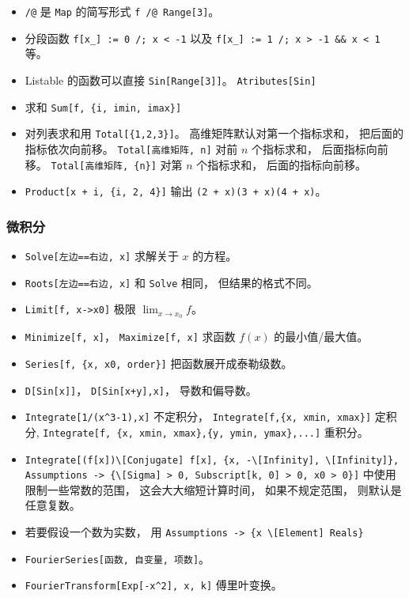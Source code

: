 \begin{itemize}
\item \verb|/@| 是 \verb|Map| 的简写形式 \verb|f /@ Range[3]|。
\item 分段函数 \verb|f[x_] := 0 /; x < -1| 以及 \verb|f[x_] := 1 /; x > -1 && x < 1| 等。
\item Listable 的函数可以直接 \verb|Sin[Range[3]]|。 \verb|Atributes[Sin]|
\item 求和 \verb|Sum[f, {i, imin, imax}]|
\item 对列表求和用 \verb|Total[{1,2,3}]|。 高维矩阵默认对第一个指标求和， 把后面的指标依次向前移。 \verb|Total[高维矩阵, n]| 对前 $n$ 个指标求和， 后面指标向前移。 \verb|Total[高维矩阵, {n}]| 对第 $n$ 个指标求和， 后面的指标向前移。
\item \verb|Product[x + i, {i, 2, 4}]| 输出 \verb|(2 + x)(3 + x)(4 + x)|。
\end{itemize}

\subsubsection{微积分}
\begin{itemize}
\item \verb|Solve[左边==右边, x]| 求解关于 $x$ 的方程。
\item \verb|Roots[左边==右边, x]| 和 \verb|Solve| 相同， 但结果的格式不同。
\item \verb|Limit[f, x->x0]| 极限 $\lim_{x\to x_0} f$。
\item \verb|Minimize[f, x]|， \verb|Maximize[f, x]| 求函数 $f(x)$ 的最小值/最大值。
\item \verb|Series[f, {x, x0, order}]| 把函数展开成泰勒级数。
\item \verb|D[Sin[x]]|， \verb|D[Sin[x+y],x]|， 导数和偏导数。
\item \verb|Integrate[1/(x^3-1),x]| 不定积分， \verb|Integrate[f,{x, xmin, xmax}]| 定积分, \verb|Integrate[f, {x, xmin, xmax},{y, ymin, ymax},...]| 重积分。
\item \verb|Integrate[(f[x])\[Conjugate] f[x], {x, -\[Infinity], \[Infinity]}, Assumptions -> {\[Sigma] > 0, Subscript[k, 0] > 0, x0 > 0}]| 中使用限制一些常数的范围， 这会大大缩短计算时间， 如果不规定范围， 则默认是任意复数。
\item 若要假设一个数为实数， 用 \verb|Assumptions -> {x \[Element] Reals}|
\item \verb|FourierSeries[函数, 自变量, 项数]|。
\item \verb|FourierTransform[Exp[-x^2], x, k]| 傅里叶变换。
\end{itemize}

